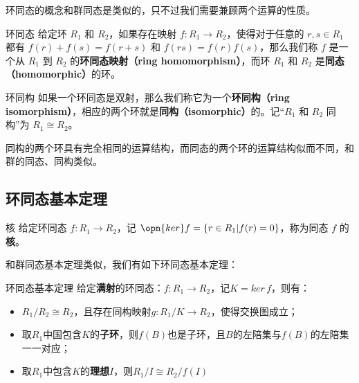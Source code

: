 

环同态的概念和群同态是类似的，只不过我们需要兼顾两个运算的性质。


\begin{definition}{环同态}
给定环 $R_1$ 和 $R_2$，如果存在映射 $f:R_1\rightarrow R_2$，使得对于任意的 $r, s\in R_1$ 都有 $f(r)+f(s)=f(r+s)$ 和 $f(rs)=f(r)f(s)$，那么我们称 $f$ 是一个从 $R_1$ 到 $R_2$ 的\textbf{环同态映射（ring homomorphism）}，而环 $R_1$ 和 $R_2$ 是\textbf{同态（homomorphic）}的环。
\end{definition}

\begin{definition}{环同构}
如果一个环同态是双射，那么我们称它为一个\textbf{环同构（ring isomorphism）}，相应的两个环就是\textbf{同构（isomorphic）}的。记“$R_1$ 和 $R_2$ 同构”为 $R_1\cong R_2$。
\end{definition}

同构的两个环具有完全相同的运算结构，而同态的两个环的运算结构似而不同，和群的同态、同构类似。

\subsection{环同态基本定理}

\begin{definition}{核}
给定环同态 $f:R_1\rightarrow R_2$，记 $\opn{ker}f=\{r\in R_1|f(r)=0\}$，称为同态 $f$ 的\textbf{核}。
\end{definition}


和群同态基本定理类似，我们有如下环同态基本定理：

\begin{theorem}{环同态基本定理}
给定\textbf{满射}的环同态：$f:R_1\rightarrow R_2$，记$K= ker\,f$，则有：
\begin{itemize}
\item $R_1/R_2\cong R_2$，且存在同构映射$g:R_1/K\rightarrow R_2$，使得交换图成立；
\item 取$R_1$中国包含$K$的\textbf{子环}，则$f(B)$也是子环，且$B$的左陪集与$f(B)$的左陪集一一对应；
\item 取$R_1$中包含$K$的\textbf{理想}$I$，则$R_1/I \cong R_2/f(I)$
\end{itemize}
\end{theorem}





